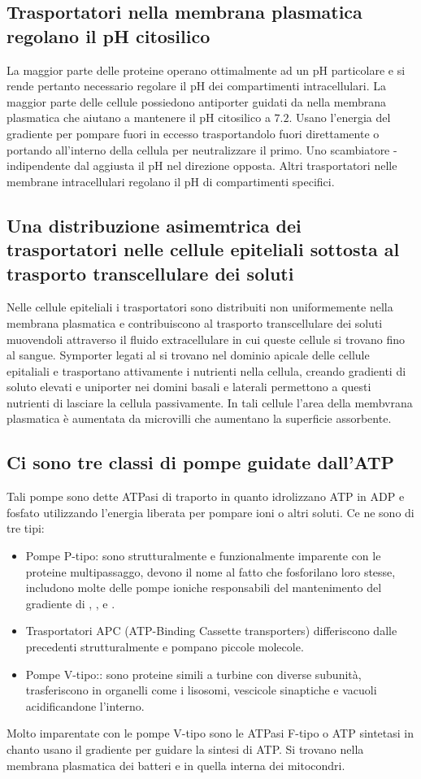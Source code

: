 \subsection{Trasportatori nella membrana plasmatica regolano il pH citosilico}
La maggior parte delle proteine operano ottimalmente ad un pH particolare e si rende pertanto necessario regolare il pH dei compartimenti intracellulari. La maggior parte delle cellule
possiedono antiporter guidati da  nella membrana plasmatica che aiutano a mantenere il pH citosilico a $7.2$. Usano l'energia del gradiente  per pompare fuori  in
eccesso trasportandolo fuori direttamente o portando all'interno della cellula  per neutralizzare il primo. Uno scambiatore - indipendente dal  
aggiusta il pH nel direzione opposta. Altri trasportatori nelle membrane intracellulari regolano il pH di compartimenti specifici.
\subsection{Una distribuzione asimemtrica dei trasportatori nelle cellule epiteliali sottosta al trasporto transcellulare dei soluti}
Nelle cellule epiteliali i trasportatori sono distribuiti non uniformemente nella membrana plasmatica e contribuiscono al trasporto transcellulare dei soluti muovendoli attraverso il 
fluido extracellulare in cui queste cellule si trovano fino al sangue. Symporter legati al  si trovano nel dominio apicale delle cellule epitaliali e trasportano attivamente i 
nutrienti nella cellula, creando gradienti  di soluto elevati e uniporter nei domini basali e laterali permettono a questi nutrienti di lasciare la cellula passivamente. In tali cellule
l'area della membvrana plasmatica \`e aumentata da microvilli che aumentano la superficie assorbente. 
\subsection{Ci sono tre classi di pompe guidate dall'ATP}
Tali pompe sono dette ATPasi di traporto in quanto idrolizzano ATP in ADP e fosfato utilizzando l'energia liberata per pompare ioni o altri soluti. Ce ne sono di tre tipi:
\begin{itemize}
	\item Pompe P-tipo: sono strutturalmente e funzionalmente imparente con le proteine multipassaggo, devono il nome al fatto che fosforilano loro stesse, includono molte delle 
		pompe ioniche responsabili del mantenimento del gradiente di , ,  e .
	\item Trasportatori APC (ATP-Binding Cassette transporters) differiscono dalle precedenti strutturalmente e pompano piccole molecole.
	\item Pompe V-tipo:: sono proteine simili a turbine con diverse subunit\`a, trasferiscono  in organelli come i lisosomi, vescicole sinaptiche e vacuoli acidificandone
		l'interno.
\end{itemize}
Molto imparentate con le pompe V-tipo sono le ATPasi F-tipo o ATP sintetasi in chanto usano il gradiente  per guidare la sintesi di ATP. Si trovano nella membrana plasmatica dei
batteri e in quella interna dei mitocondri. 
